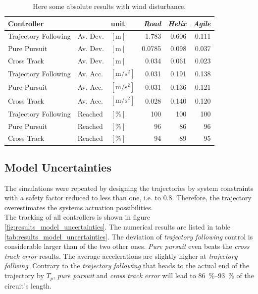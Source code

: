 \begin{table}[h]
\begin{center}
 \begin{tabular}{lll|rrr}
 \hline
 Controller &   & unit & \textit{Road} & \textit{Helix} & \textit{Agile} \\ \hline \hline
 Trajectory Following & Av. Dev. & $[\si{\meter}]$ & 1.783 & 0.606 & 0.111 \\
 Pure Pursuit         & Av. Dev. & $[\si{\meter}]$ & 0.0785 & 0.098 & 0.037 \\
 Cross Track          & Av. Dev. & $[\si{\meter}]$ &  0.034 & 0.061 & 0.023 \\

 Trajectory Following & Av. Acc. & $[\si{\meter\per\square\second}]$ & 0.031 & 0.191 & 0.138 \\
 Pure Pursuit         & Av. Acc. & $[\si{\meter\per\square\second}]$ & 0.031 & 0.136 & 0.121 \\
 Cross Track          & Av. Acc. & $[\si{\meter\per\square\second}]$ & 0.028 & 0.140 & 0.120 \\
 
 Trajectory Following & Reached & $[\si{\percent}]$ & 100 & 100 & 100 \\
 Pure Pursuit         & Reached & $[\si{\percent}]$ &  96 &  86 &  96 \\
 Cross Track          & Reached & $[\si{\percent}]$ &  94 &  89 &  95 \\
 \hline
 \end{tabular}
 \caption{Here some absolute results with wind disturbance.}\vspace{1px}
 \label{tab:results_wind_disturbance}
\end{center}
\end{table}


\subsection{Model Uncertainties}
\label{sub:results_model_uncertainties}

The simulations were repeated by designing the trajectories by system constraints with a safety factor reduced to less than one, i.e. to \num{0.8}. Therefore, the trajectory overestimates the systems actuation possibilities. \\
The tracking of all controllers is shown in figure \ref{fig:results_model_uncertainties}. The numerical results are listed in table \ref{tab:results_model_uncertainties}. The deviation of \textit{trajectory following} control is considerable larger than of the two other ones. \textit{Pure pursuit} even beats the \textit{cross track error} results. The average accelerations are slightly higher at \textit{trajectory follwing}. Contrary to the \textit{trajectory following} that heads to the actual end of the trajectory by $T_p$, \textit{pure pursuit} and \textit{cross track error} will lead to \SIrange{86}{93}{\percent} of the circuit's length.

